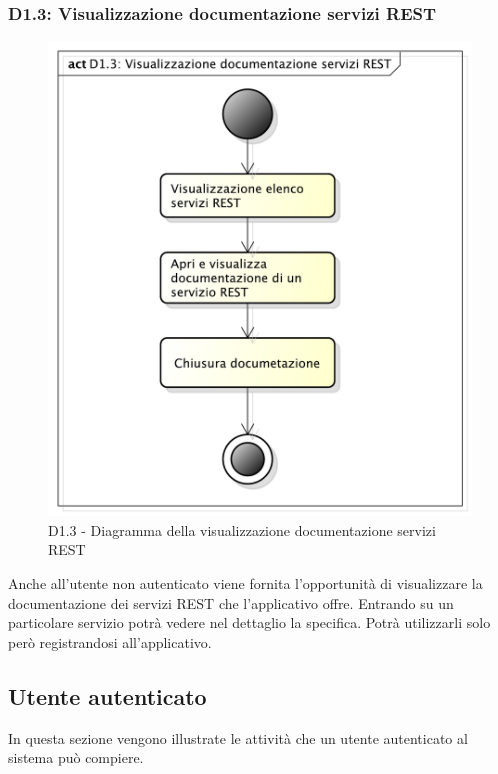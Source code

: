 		\subsubsection{D1.3: Visualizzazione documentazione servizi REST} %
		\label{ssub:visualizzazione_documentazione_servizi_rest}
		\begin{figure}[!htbp]
			\centering
			\centerline{\includegraphics[scale=0.45]{./images/D1_3.pdf}}
			\caption{D1.3 - Diagramma della visualizzazione documentazione servizi REST}
		\end{figure}
		\noindent
		Anche all'utente non autenticato viene fornita l'opportunità di visualizzare la documentazione dei servizi REST che l'applicativo offre. Entrando su un particolare servizio potrà vedere nel dettaglio la specifica. Potrà utilizzarli solo però registrandosi all'applicativo.


	\pagebreak
	\clearpage \newpage

	\subsection{Utente autenticato} %
	\label{sub:utente_autenticato}
	In questa sezione vengono illustrate le attività che un utente autenticato al sistema può compiere.
